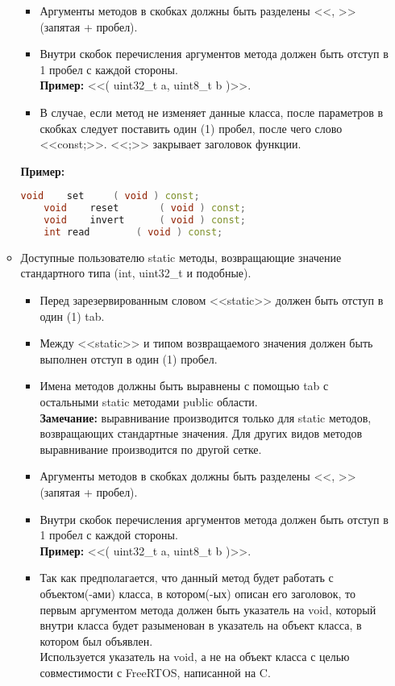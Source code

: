 \begin{enumerate}
\begin{itemize}
\begin{itemize}
			\item Аргументы методов в скобках должны быть разделены <<, >> (запятая + пробел).
			\item Внутри скобок перечисления аргументов метода должен быть отступ в 1 пробел с каждой стороны.\\\textbf{Пример: } <<( uint32\_t a, uint8\_t b )>>.
			\item В случае, если метод не изменяет данные класса, после параметров в скобках следует поставить один (1) пробел, после чего слово <<const;>>. <<;>> закрывает заголовок функции.
		\end{itemize}
		\textbf{Пример:}
		\begin{lstlisting}[language=C++, frame=tlBR, basicstyle=\fontsize{8}{8}\ttfamily]
	void	set		( void ) const;
	void	reset		( void ) const;
	void	invert		( void ) const;
	int	read		( void ) const;
		\end{lstlisting}
		\item Доступные пользователю static методы, возвращающие значение стандартного типа (int, uint32\_t и подобные).
		\begin{itemize}
			\item Перед зарезервированным словом <<static>> должен быть отступ в один (1) tab.
			\item Между <<static>> и типом возвращаемого значения должен быть выполнен отступ в один (1) пробел.
			\item Имена методов должны быть выравнены с помощью tab с остальными static методами public области.\\\textbf{Замечание: }выравнивание производится только для static методов, возвращающих стандартные значения. Для других видов методов выравнивание производится по другой сетке.
			\item Аргументы методов в скобках должны быть разделены <<, >> (запятая + пробел).
			\item Внутри скобок перечисления аргументов метода должен быть отступ в 1 пробел с каждой стороны.\\\textbf{Пример: } <<( uint32\_t a, uint8\_t b )>>.
			\item Так как предполагается, что данный метод будет работать с объектом(-ами) класса, в котором(-ых) описан его заголовок, то первым аргументом метода должен быть указатель на void, который внутри класса будет разыменован в указатель на объект класса, в котором был объявлен.\\Используется указатель на void, а не на объект класса с целью совместимости с FreeRTOS, написанной на C.

\end{itemize}
\end{itemize}
\end{enumerate}
